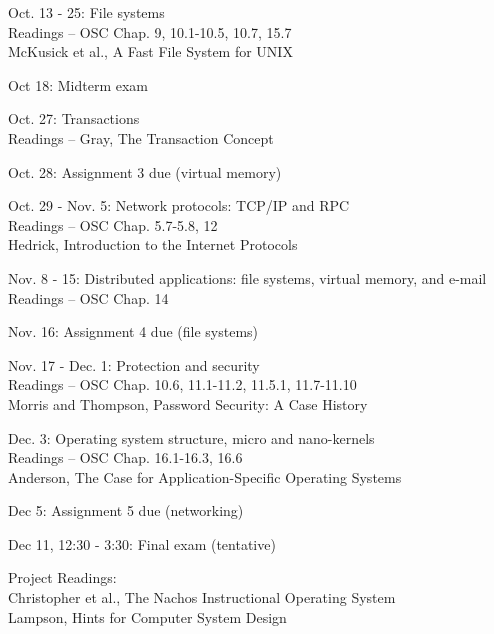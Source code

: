 \begin{description}
\item{Oct. 13 - 25:} File systems\\
  Readings -- OSC Chap. 9, 10.1-10.5, 10.7, 15.7 \\
  McKusick et al., A Fast File System for UNIX

\item{Oct 18:} Midterm exam 

\item{Oct. 27:} Transactions\\
  Readings -- Gray, The Transaction Concept

\item{Oct. 28:} Assignment 3 due (virtual memory)

\item{Oct. 29 - Nov. 5:} Network protocols: TCP/IP and RPC\\
  Readings -- OSC Chap. 5.7-5.8, 12\\
  Hedrick, Introduction to the Internet Protocols

\item{Nov. 8 - 15:} Distributed applications: file systems, virtual memory, and e-mail\\
  Readings -- OSC Chap. 14

\item{Nov. 16:} Assignment 4 due (file systems)

\item{Nov. 17 - Dec. 1:} Protection and security\\
  Readings -- OSC Chap. 10.6, 11.1-11.2, 11.5.1, 11.7-11.10\\
  Morris and Thompson, Password Security: A Case History

\item{Dec. 3:} Operating system structure, micro and nano-kernels\\
  Readings -- OSC Chap. 16.1-16.3, 16.6\\
  Anderson, The Case for Application-Specific Operating Systems

\item{Dec 5:} Assignment 5 due (networking)

\item{Dec 11, 12:30 - 3:30:} Final exam (tentative)

\item{Project Readings:}\\
  Christopher et al., The Nachos Instructional Operating System\\
  Lampson, Hints for Computer System Design

\end{description}


